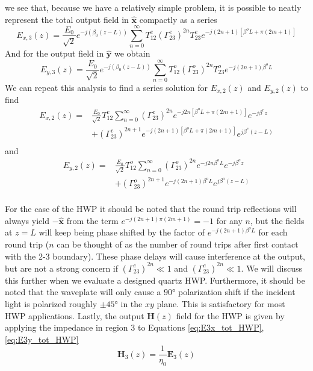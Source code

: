 \documentclass{optica-article}
\newcommand{\bv}[1]{\mathbf{#1}}
\begin{document}
we see that, because we have a
relatively simple problem, it is possible to neatly represent the total 
output field in $\bv{\hat{x}}$ compactly as a series
\begin{equation}\label{eq:E3x_tot_HWP}
  E_{x,3}(z) = \frac{E_0}{\sqrt{2}}e^{-j(\beta_0(z-L))}\sum_{n=0}^\infty 
  T_{12}^e \left(\Gamma_{23}^e\right)^{2n}T_{23}^e
  e^{-j(2n+1)\left[\beta^oL + \pi(2m+1)\right]}
\end{equation}
And for the output field in $\bv{\hat{y}}$ we obtain
\begin{equation}\label{eq:E3y_tot_HWP}
  E_{y,3}(z) = \frac{E_0}{\sqrt{2}}e^{-j(\beta_0(z-L))}\sum_{n=0}^\infty 
  T_{12}^o \left(\Gamma_{23}^o\right)^{2n}T_{23}^o
  e^{-j(2n+1)\beta^oL}
\end{equation}
We can repeat this analysis to find a series solution for $E_{x,2}(z)$ and
$E_{y,2}(z)$ to find
\begin{equation}
  \begin{aligned}
  E_{x,2}(z) = & \frac{E_0}{\sqrt{2}}T_{12}^e\sum_{n=0}^\infty 
   \left(\Gamma_{23}^e\right)^{2n}e^{-j2n\left[\beta^oL + \pi(2m+1)\right]}
   e^{-j\beta^e z}\\ &+ 
   \left(\Gamma_{23}^e\right)^{2n+1}e^{-j(2n+1)\left[\beta^oL + \pi(2m+1)\right]}
   e^{j\beta^e (z-L)}\\
  \end{aligned}
\end{equation}
and 
\begin{equation}
  \begin{aligned}
  E_{y,2}(z) = & \frac{E_0}{\sqrt{2}}T_{12}^o\sum_{n=0}^\infty 
   \left(\Gamma_{23}^o\right)^{2n}e^{-j2n\beta^oL}
   e^{-j\beta^o z}\\ &+ 
   \left(\Gamma_{23}^o\right)^{2n+1}e^{-j(2n+1)\beta^oL}
   e^{j\beta^o (z-L)}\\
  \end{aligned}
\end{equation}

For the case of the HWP it should be noted that the round trip reflections will 
always yield $-\bv{\hat{x}}$ from the term  
$e^{-j(2n+1)\pi(2m+1)} = -1$ for any $n$, but the 
fields at $z=L$ will keep being phase shifted by the factor of 
$e^{-j(2n+1)\beta^oL}$ for each round trip ($n$ can be thought of as the number 
of round trips after first contact with the 2-3 boundary). These phase delays
will cause interference at the output, but are not a strong concern if
$(\Gamma_{23}^e)^{2n} \ll 1$ and $(\Gamma_{23}^e)^{2n} \ll 1$. We will discuss
this further when we evaluate a designed quartz HWP. Furthermore, it should be
noted that the waveplate will only cause a $\ang{90}$ polarization shift if the
incident light is polarized roughly $\pm\ang{45}$ in the $xy$ plane. This is 
satisfactory for most HWP applications. Lastly, the output $\bv{H}(z)$ field
for the HWP is given by applying the impedance in region 3 to Equations
\eqref{eq:E3x_tot_HWP}, \eqref{eq:E3y_tot_HWP} \cite{Balanis-2012}
\begin{equation}\label{eq:H3}
  \bv{H}_3(z) = \frac{1}{\eta_0}\bv{E}_3(z)
\end{equation}
\end{document}
